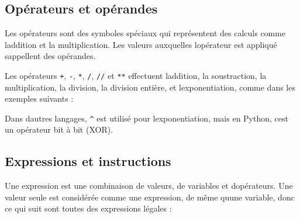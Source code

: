 \hypertarget{opuxe9rateurs-et-opuxe9randes}{%
\subsection{Opérateurs et
opérandes}\label{opuxe9rateurs-et-opuxe9randes}}

Les opérateurs sont des symboles spéciaux qui représentent des calculs
comme l\textquotesingle addition et la multiplication. Les valeurs
auxquelles l\textquotesingle opérateur est appliqué
s\textquotesingle appellent des opérandes.

Les opérateurs \texttt{+}, \texttt{-}, \texttt{*}, \texttt{/},
\texttt{//} et \texttt{**} effectuent l\textquotesingle addition, la
soustraction, la multiplication, la division, la division entière, et
l\textquotesingle exponentiation, comme dans les exemples suivants :

\begin{Shaded}
\begin{Highlighting}[]
\OperatorTok{+}
\OperatorTok{{-}}
\OperatorTok{*}\OperatorTok{+}
\OperatorTok{/}
\OperatorTok{**}
\NormalTok{(}\OperatorTok{+}\NormalTok{)}\OperatorTok{*}\NormalTok{(}\OperatorTok{{-}}\NormalTok{)}
\end{Highlighting}
\end{Shaded}

Dans d\textquotesingle autres langages, \texttt{\^{}} est utilisé pour
l\textquotesingle exponentiation, mais en Python, c\textquotesingle est
un opérateur bit à bit (XOR).

\hypertarget{expressions-et-instructions}{%
\subsection{Expressions et
instructions}\label{expressions-et-instructions}}

Une expression est une combinaison de valeurs, de variables et
d\textquotesingle opérateurs. Une valeur seule est considérée comme une
expression, de même qu\textquotesingle une variable, donc ce qui suit
sont toutes des expressions légales :

\begin{Shaded}
\begin{Highlighting}[]
\OperatorTok{+} 
\end{Highlighting}
\end{Shaded}

